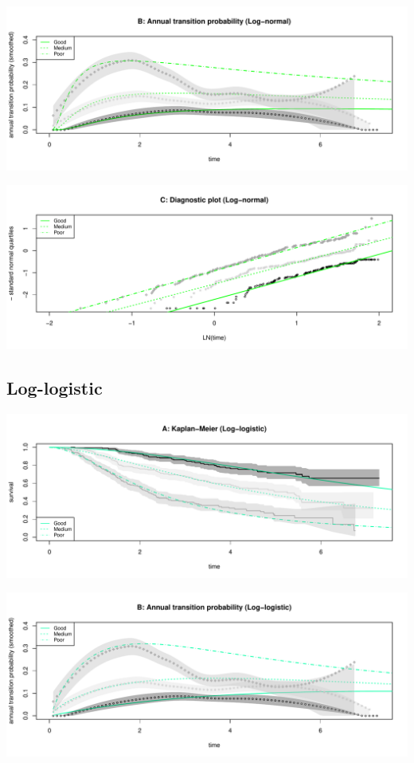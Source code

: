 \documentclass[
]{article}
\begin{document}
\begin{flushleft}\includegraphics[height=0.25\textheight]{Images/lnorm-2} \end{flushleft}

\begin{flushleft}\includegraphics[height=0.25\textheight]{Images/lnorm-3} \end{flushleft}

\clearpage

\hypertarget{log-logistic}{%
\subsection{Log-logistic}\label{log-logistic}}

\begin{flushleft}\includegraphics[height=0.25\textheight]{Images/llog-1} \end{flushleft}

\begin{flushleft}\includegraphics[height=0.25\textheight]{Images/llog-2} \end{flushleft}
\end{document}
